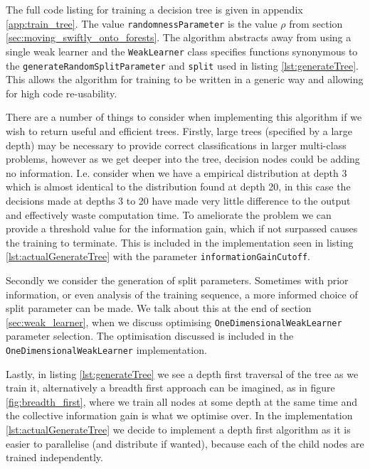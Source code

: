 \documentclass[12pt,twoside,notitlepage]{report}
\begin{document}
          \clearpage
          The full code listing for training a decision tree is given in appendix \ref{app:train_tree}. The value 
          \texttt{randomnessParameter} is the value $\rho$ from section \ref{sec:moving_swiftly_onto_forests}. The algorithm 
          abstracts away from using a single weak learner and the \texttt{WeakLearner} class specifies functions 
          synonymous to the \texttt{generateRandomSplitParameter} and \texttt{split} used in listing \ref{lst:generateTree}.
          This allows the algorithm for training to be written in a generic way and allowing for high code re-usability. 

          There are a number of things to consider when implementing this algorithm if we wish to return useful and 
          efficient trees. Firstly, large trees (specified by a large depth) may be necessary to provide correct 
          classifications in larger multi-class problems, however as we get deeper into the tree, decision nodes could 
          be adding no information. I.e. consider when we have a empirical distribution at depth 
          3 which is almost identical to the distribution found 
          at depth 20, in this case the decisions made at depths 3 to 20 have made very little difference to the output 
          and effectively waste computation time. To ameliorate the problem we can provide a threshold value for the 
          information gain, which if not surpassed causes the training to terminate. This is included in the implementation seen in 
          listing \ref{lst:actualGenerateTree} with the parameter \texttt{informationGainCutoff}. 

          Secondly we consider the generation of split parameters. Sometimes with prior information, or even analysis 
          of the training sequence, a more informed choice of split parameter can be made. We talk about this at the 
          end of section \ref{sec:weak_learner}, when we discuss optimising \texttt{OneDimensionalWeakLearner} parameter 
          selection. The optimisation discussed is included in the \texttt{OneDimensionalWeakLearner} implementation.

          Lastly, in listing \ref{lst:generateTree} we see a depth first traversal of the tree as we train it, 
          alternatively a breadth first approach can be imagined, as in figure \ref{fig:breadth_first}, where 
          we train all nodes at some depth at the 
          same time and the collective information gain is what we optimise over. In the implementation 
          \ref{lst:actualGenerateTree} we decide to implement a depth first algorithm as it is easier to parallelise 
          (and distribute if wanted), because each of the child nodes are trained independently.
\end{document}
